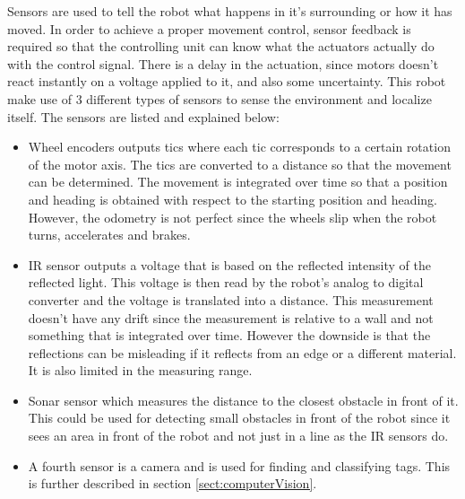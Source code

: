 Sensors are used to tell the robot what happens in it's surrounding or how it has moved. 
In order to achieve a proper movement control, sensor feedback is required so that the controlling unit can know what the actuators actually do with the control signal. There is a delay in the actuation, since motors doesn't react instantly on a voltage applied to it, and also some uncertainty. This robot make use of 3 different types of sensors to sense the environment and localize itself. The sensors are listed and explained below:
\begin{itemize}
\item Wheel encoders outputs tics where each tic corresponds to a certain rotation of the motor axis. The tics are converted to a distance so that the movement can be determined. The movement is integrated over time so that a position and heading is obtained with respect to the starting position and heading. However, the odometry is not perfect since the wheels slip when the robot turns, accelerates and brakes. 

\item IR sensor outputs a voltage that is based on the reflected intensity of the reflected light. This voltage is then read by the robot's analog to digital converter and the voltage is translated into a distance. This measurement doesn't have any drift since the measurement is relative to a wall and not something that is integrated over time. However the downside is that the reflections can be misleading if it reflects from an edge or a different material. It is also limited in the measuring range.

\item Sonar sensor which measures the distance to the closest obstacle in front of it. This could be used for detecting small obstacles in front of the robot since it sees an area in front of the robot and not just in a line as the IR sensors do.

\item A fourth sensor is a camera and is used for finding and classifying tags. This is further described in section \ref{sect:computerVision}.

\end{itemize}